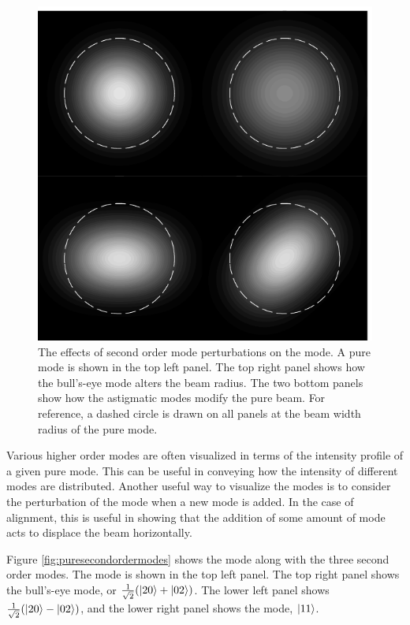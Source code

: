 \begin{figure}[h!]
  \begin{center}
  \leavevmode
  \includegraphics{figs-ap-notes/secondordermodes.pdf}
  \end{center}
  \caption[The effects of second order mode perturbations on the  mode.]{The effects of second order mode perturbations on the  mode. A pure  mode is shown  in the top left panel. The top right panel shows how the bull's-eye mode alters the beam radius. The two bottom panels show how the astigmatic modes modify the pure beam. For reference, a dashed circle is drawn on all panels at the beam width radius of the pure  mode.}
  \label{fig:secondordermodes}
\end{figure}
Various higher order modes are often visualized in terms of the intensity profile of a given pure mode. %
This can be useful in conveying how the intensity of different modes are distributed. %
Another useful way to visualize the modes is to consider the perturbation of the  mode when a new mode is added. %
In the case of alignment, this is useful in showing that the addition of some amount of  mode acts to displace the beam horizontally.

Figure \ref{fig:puresecondordermodes} shows the  mode along with the three second order modes. %
The  mode is shown in the top left panel. %
The top right panel shows the bull's-eye mode, or $\frac{1}{\sqrt{2}}(\left| 20 \right>+\left| 02 \right>)$. %
The lower left panel shows $\frac{1}{\sqrt{2}}(\left| 20 \right>-\left| 02 \right>)$, and the lower right panel shows the  mode, $\left| 11 \right>$.

